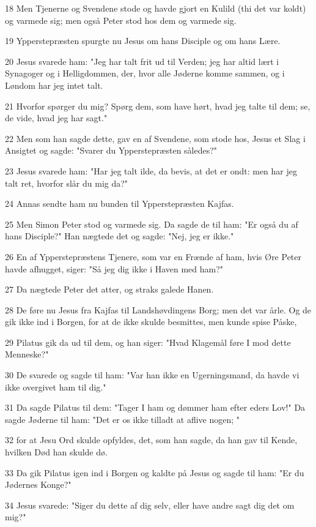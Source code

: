 \par 18 Men Tjenerne og Svendene stode og havde gjort en Kulild (thi det var koldt) og varmede sig; men også Peter stod hos dem og varmede sig.
\par 19 Ypperstepræsten spurgte nu Jesus om hans Disciple og om hans Lære.
\par 20 Jesus svarede ham: "Jeg har talt frit ud til Verden; jeg har altid lært i Synagoger og i Helligdommen, der, hvor alle Jøderne komme sammen, og i Løndom har jeg intet talt.
\par 21 Hvorfor spørger du mig? Spørg dem, som have hørt, hvad jeg talte til dem; se, de vide, hvad jeg har sagt."
\par 22 Men som han sagde dette, gav en af Svendene, som stode hos, Jesus et Slag i Ansigtet og sagde: "Svarer du Ypperstepræsten således?"
\par 23 Jesus svarede ham: "Har jeg talt ilde, da bevis, at det er ondt: men har jeg talt ret, hvorfor slår du mig da?"
\par 24 Annas sendte ham nu bunden til Ypperstepræsten Kajfas.
\par 25 Men Simon Peter stod og varmede sig. Da sagde de til ham: "Er også du af hans Disciple?" Han nægtede det og sagde: "Nej, jeg er ikke."
\par 26 En af Ypperstepræstens Tjenere, som var en Frænde af ham, hvis Øre Peter havde afhugget, siger: "Så jeg dig ikke i Haven med ham?"
\par 27 Da nægtede Peter det atter, og straks galede Hanen.
\par 28 De føre nu Jesus fra Kajfas til Landshøvdingens Borg; men det var årle. Og de gik ikke ind i Borgen, for at de ikke skulde besmittes, men kunde spise Påske,
\par 29 Pilatus gik da ud til dem, og han siger: "Hvad Klagemål føre I mod dette Menneske?"
\par 30 De svarede og sagde til ham: "Var han ikke en Ugerningsmand, da havde vi ikke overgivet ham til dig."
\par 31 Da sagde Pilatus til dem: "Tager I ham og dømmer ham efter eders Lov!" Da sagde Jøderne til ham: "Det er os ikke tilladt at aflive nogen; "
\par 32 for at Jesu Ord skulde opfyldes, det, som han sagde, da han gav til Kende, hvilken Død han skulde dø.
\par 33 Da gik Pilatus igen ind i Borgen og kaldte på Jesus og sagde til ham: "Er du Jødernes Konge?"
\par 34 Jesus svarede: "Siger du dette af dig selv, eller have andre sagt dig det om mig?"
